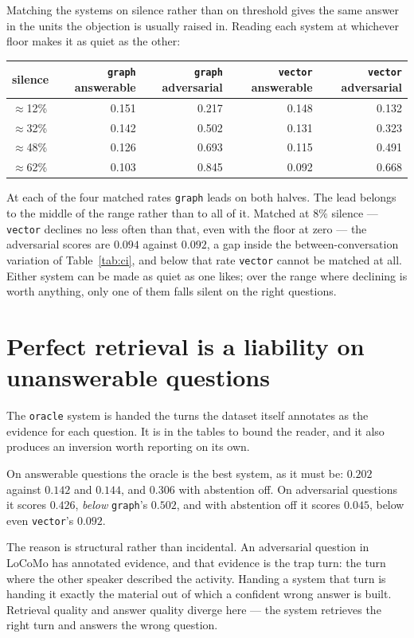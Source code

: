 \documentclass[11pt]{article}
\newcommand{\arm}[1]{\texttt{#1}}
\begin{document}
Matching the systems on silence rather than on threshold gives the same answer
in the units the objection is usually raised in. Reading each system at whichever
floor makes it as quiet as the other:

\begin{center}
\small
\begin{tabular}{@{}lrrrr@{}}
\toprule
silence & \arm{graph} answerable & \arm{graph} adversarial
        & \arm{vector} answerable & \arm{vector} adversarial \\
\midrule
$\approx$12\% & 0.151 & 0.217 & 0.148 & 0.132 \\
$\approx$32\% & 0.142 & 0.502 & 0.131 & 0.323 \\
$\approx$48\% & 0.126 & 0.693 & 0.115 & 0.491 \\
$\approx$62\% & 0.103 & 0.845 & 0.092 & 0.668 \\
\bottomrule
\end{tabular}
\end{center}

At each of the four matched rates \arm{graph} leads on both halves. The lead
belongs to the middle of the range rather than to all of it. Matched at $8\%$
silence --- \arm{vector} declines no less often than that, even with the floor
at zero --- the adversarial scores are $0.094$ against $0.092$, a gap inside the
between-conversation variation of Table~\ref{tab:ci}, and below that rate
\arm{vector} cannot be matched at all. Either system can be made as quiet
as one likes; over the range where declining is worth anything, only one of them
falls silent on the right questions.

\section{Perfect retrieval is a liability on unanswerable questions}
\label{sec:oracle}

The \arm{oracle} system is handed the turns the dataset itself annotates as the
evidence for each question. It is in the tables to bound the reader, and it also
produces an inversion worth reporting on its own.

On answerable questions the oracle is the best system, as it must be: $0.202$
against $0.142$ and $0.144$, and $0.306$ with abstention off. On adversarial
questions it scores $0.426$, \emph{below} \arm{graph}'s $0.502$, and with
abstention off it scores $0.045$, below even \arm{vector}'s $0.092$.

The reason is structural rather than incidental. An adversarial question in
LoCoMo has annotated evidence, and that evidence is the trap turn: the turn
where the other speaker described the activity. Handing a system that turn is
handing it exactly the material out of which a confident wrong answer is built.
Retrieval quality and answer quality diverge here --- the system retrieves the
right turn and answers the wrong question.
\end{document}
